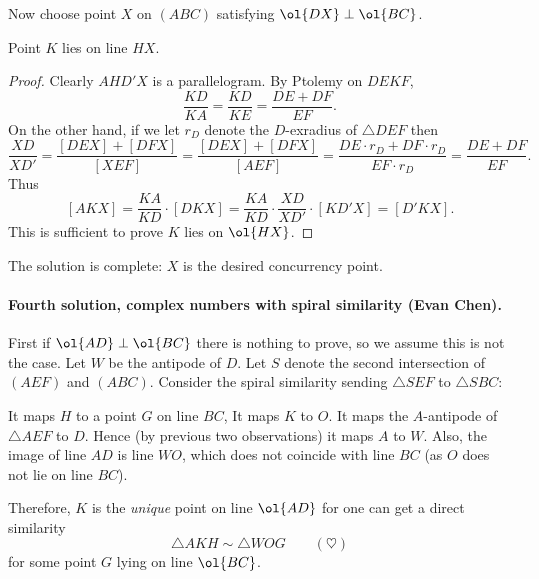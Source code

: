 \documentclass[11pt]{scrartcl}
\begin{document}
Now choose point $X$ on $(ABC)$ satisfying $\ol{DX} \perp \ol{BC}$.
\begin{claim*}
  Point $K$ lies on line $HX$.
\end{claim*}
\begin{proof}
  Clearly $AHD'X$ is a parallelogram.
  By Ptolemy on $DEKF$,
  \[\frac{KD}{KA} = \frac{KD}{KE} = \frac{DE + DF}{EF}.\]
  On the other hand,
  if we let $r_D$ denote the $D$-exradius of $\triangle DEF$ then
  \[\frac{XD}{XD'}
    = \frac{[DEX] + [DFX]}{[XEF]}
    = \frac{[DEX] + [DFX]}{[AEF]}
    = \frac{DE \cdot r_D + DF \cdot r_D}{EF \cdot r_D}
  = \frac{DE + DF}{EF}. \]
  Thus
  \[[AKX] = \frac{KA}{KD} \cdot [DKX]
    = \frac{KA}{KD} \cdot \frac{XD}{XD'} \cdot [KD'X]
    = [D'KX].\]
  This is sufficient to prove $K$ lies on $\ol{HX}$.
\end{proof}
The solution is complete: $X$ is the desired concurrency point.

\paragraph{Fourth solution, complex numbers with spiral similarity (Evan Chen).}
First if $\ol{AD} \perp \ol{BC}$ there is nothing to prove,
so we assume this is not the case.
Let $W$ be the antipode of $D$.
Let $S$ denote the second intersection of $(AEF)$ and $(ABC)$.
Consider the spiral similarity sending $\triangle SEF$ to $\triangle SBC$:
\begin{itemize}
  \ii It maps $H$ to a point $G$ on line $BC$,
  \ii It maps $K$ to $O$.
  \ii It maps the $A$-antipode of $\triangle AEF$ to $D$.
  \ii Hence (by previous two observations) it maps $A$ to $W$.
  \ii Also, the image of line $AD$ is line $WO$,
  which does not coincide with line $BC$
  (as $O$ does not lie on line $BC$).
\end{itemize}
Therefore, $K$ is the \emph{unique} point on line $\ol{AD}$
for one can get a direct similarity
\[ \triangle AKH \sim \triangle WOG \qquad(\heartsuit) \]
for some point $G$ lying on line $\ol{BC}$.
\end{document}
